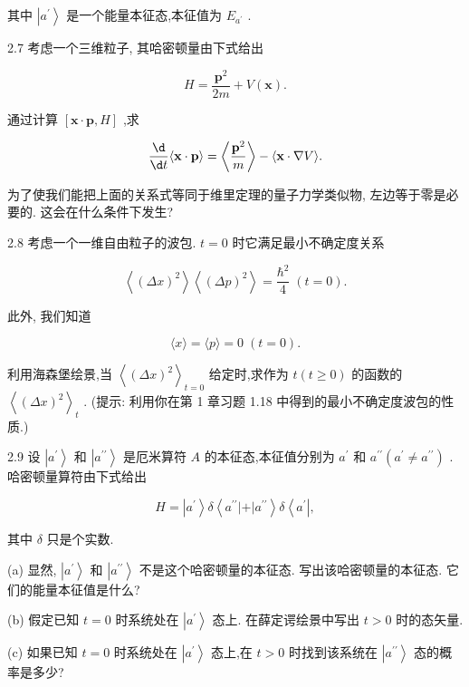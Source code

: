 \documentclass[lang=cn,newtx,10pt,scheme=chinese,thmcnt=section]{elegantbook}
\begin{document}
其中 $\left| {a}^{\prime }\right\rangle$ 是一个能量本征态,本征值为 ${E}_{{a}^{\prime }}$ .

2.7 考虑一个三维粒子, 其哈密顿量由下式给出

$$
H = \frac{{\mathbf{p}}^{2}}{2m} + V\left( \mathbf{x}\right) .
$$

通过计算 $\left\lbrack {\mathbf{x} \cdot \mathbf{p}, H}\right\rbrack$ ,求

$$
\frac{\d}{\d t}\langle \mathbf{x} \cdot \mathbf{p}\rangle = \left\langle \frac{{\mathbf{p}}^{2}}{m}\right\rangle - \langle \mathbf{x} \cdot \nabla V\rangle .
$$

为了使我们能把上面的关系式等同于维里定理的量子力学类似物, 左边等于零是必要的. 这会在什么条件下发生?

2.8 考虑一个一维自由粒子的波包. $t = 0$ 时它满足最小不确定度关系

$$
\left\langle {\left( \Delta x\right) }^{2}\right\rangle \left\langle {\left( \Delta p\right) }^{2}\right\rangle = \frac{{\hbar }^{2}}{4}\;\left( {t = 0}\right) .
$$

此外, 我们知道

$$
\langle x\rangle = \langle p\rangle = 0\;\left( {t = 0}\right) .
$$

利用海森堡绘景,当 ${\left\langle {\left( \Delta x\right) }^{2}\right\rangle }_{t = 0}$ 给定时,求作为 $t\left( {t \geq 0}\right)$ 的函数的 ${\left\langle {\left( \Delta x\right) }^{2}\right\rangle }_{t}$ . (提示: 利用你在第 1 章习题 1.18 中得到的最小不确定度波包的性质.)

2.9 设 $\left| {a}^{\prime }\right\rangle$ 和 $\left| {a}^{\prime \prime }\right\rangle$ 是厄米算符 $A$ 的本征态,本征值分别为 ${a}^{\prime }$ 和 ${a}^{\prime \prime }\left( {{a}^{\prime } \neq {a}^{\prime \prime }}\right)$ . 哈密顿量算符由下式给出

$$
H = \left| {a}^{\prime }\right\rangle \delta \left\langle {{a}^{\prime \prime }\left| +\right| {a}^{\prime \prime }}\right\rangle \delta \left\langle {a}^{\prime }\right| ,
$$

其中 $\delta$ 只是个实数.

(a) 显然, $\left| {a}^{\prime }\right\rangle$ 和 $\left| {a}^{\prime \prime }\right\rangle$ 不是这个哈密顿量的本征态. 写出该哈密顿量的本征态. 它们的能量本征值是什么?

(b) 假定已知 $t = 0$ 时系统处在 $\left| {a}^{\prime }\right\rangle$ 态上. 在薛定谔绘景中写出 $t > 0$ 时的态矢量.

(c) 如果已知 $t = 0$ 时系统处在 $\left| {a}^{\prime }\right\rangle$ 态上,在 $t > 0$ 时找到该系统在 $\left| {a}^{\prime \prime }\right\rangle$ 态的概率是多少?
\end{document}
